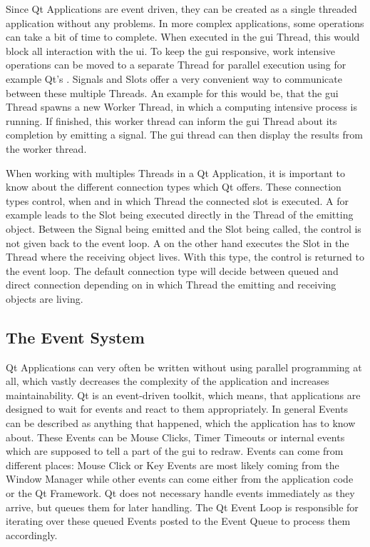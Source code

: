 Since Qt Applications are event driven, they can be created as a single threaded
application without any problems. In more complex applications, some operations
can take a bit of time to complete. When executed in the \gls{gui}
Thread, this would block all interaction with the \gls{ui}. To keep the \gls{gui}
responsive, work intensive operations can be moved to a separate Thread for
parallel execution using for example Qt's .
Signals and Slots offer a very convenient way to communicate between these
multiple Threads. An example for this would be, that the \gls{gui} Thread spawns
a new Worker Thread, in which a computing intensive process is running. If
finished, this worker thread can inform the \gls{gui} Thread about its
completion by emitting a signal. The \gls{gui} thread can then display the
results from the worker thread.

When working with multiples Threads in a Qt Application, it is important to know
about the different connection types which Qt offers. These connection types
control, when and in which Thread the connected slot is executed. A
 for example leads to the Slot
being executed directly in the Thread of the emitting object. Between the Signal
being emitted and the Slot being called, the control is not given back to the
event loop. A  on the other hand
executes the Slot in the Thread where the receiving object lives. With this
type, the control is returned to the event loop. The default connection type
 will decide between queued and
direct connection depending on in which Thread the emitting and receiving
objects are living.
\cite{QtConnectionTypes}



\subsection{The Event System}
\label{sec:fundamentals:qt:eventloop}

Qt Applications can very often be written without using parallel programming at
all, which vastly decreases the complexity of the application and increases
maintainability. Qt is an event-driven toolkit, which means, that applications
are designed to wait for events and react to them appropriately. In general
Events can be described as anything that happened, which the application
has to know about.  These Events can be Mouse Clicks, Timer Timeouts or internal
events which are supposed to tell a part of the \gls{gui} to redraw. Events can
come from different places: Mouse Click or Key Events are most likely
coming from the Window Manager while other events can come either from the
application code or the Qt Framework.
Qt does not necessary handle events immediately as they arrive, but queues
them for later handling. The Qt Event Loop is responsible for iterating over
these queued Events posted to the Event Queue to process them accordingly.


